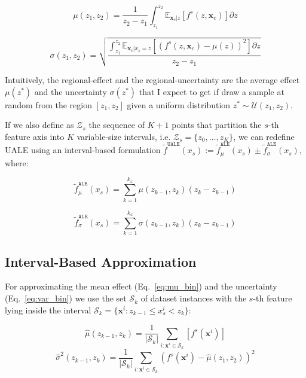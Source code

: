 \documentclass[twoside]{article}
\newcommand{\dfdx}{f^s}
\newcommand{\xc}{\mathbf{x}_c}
\begin{document}
\begin{equation}
  \label{eq:mu_bin}
  \mu(z_1, z_2) = \frac{1}{z_2 - z_1} \int_{z_1}^{z_2}
  \mathbb{E}_{\xc|z}\left [f^s(z, \xc) \right ] \partial z
\end{equation}

\noindent

\begin{equation}
  \label{eq:var_bin}
  \sigma(z_1, z_2) = \sqrt{\frac{\int_{z_1}^{z_2}
  \mathbb{E}_{\xc|x_s=z} \left [ (f^s(z, \xc) - \mu(z) )^2 \right] \partial z}{z_2 - z_1}}
\end{equation}

%
Intuitively, the regional-effect and the regional-uncertainty are the
average effect \(\mu(z^*)\) and the uncertainty \(\sigma(z^*)\) that I
expect to get if draw a sample at random from the region
\([z_1, z_2]\) given a uniform distribution
\(z^* \sim \mathcal{U}(z_1, z_2)\).

If we also define as \(\mathcal{Z}_s\) the sequence of \(K+1\) points
that partition the \(s\)-th feature axis into \(K\) variable-size
intervals, i.e. \(\mathcal{Z}_s = \{z_0, \ldots, z_K\}\), we can
redefine UALE using an interval-based formulation
\(\tilde{f}^{\mathtt{UALE}}(x_s):= \tilde{f}^{\mathtt{ALE}}_{\mu}(x_s)
\pm \tilde{f}^{\mathtt{ALE}}_{\sigma}(x_s)\), where:

\begin{equation}
  \label{eq:ALE_2}
  \tilde{f}^{\mathtt{ALE}}_{\mu}(x_s) = \sum_{k=1}^{k_x} \mu(z_{k-1}, z_k) (z_k - z_{k-1})
\end{equation}

\begin{equation}
  \label{eq:ALE_accumulated_var}
  \tilde{f}^{\mathtt{ALE}}_{\sigma}(x_s) =  \sum_{k=1}^{k_x} \sigma(z_{k-1}, z_k) (z_k - z_{k-1})
\end{equation}
%

\subsection{Interval-Based Approximation}
\label{sec:UALE-approximation}

For approximating the mean effect (Eq.~\eqref{eq:mu_bin}) and the
uncertainty (Eq.~\eqref{eq:var_bin}) we use the set \(\mathcal{S}_k\)
of dataset instances with the \(s\)-th feature lying inside the
interval
\( \mathcal{S}_k= \{ \mathbf{x}^i : z_{k-1} \leq x^i_s < z_k \} \):

\begin{equation}
  \label{eq:2}
  \hat{\mu}(z_{k-1}, z_k) = \frac{1}{|\mathcal{S}_k|}
  \sum_{i:\mathbf{x}^i \in \mathcal{S}_k} \left [ \dfdx(\mathbf{x}^i)
  \right ]
\end{equation}
%
\begin{equation}
  \label{eq:3}
  \hat{\sigma}^2(z_{k-1}, z_k) = \frac{1}{|\mathcal{S}_k|}
\sum_{i:\mathbf{x}^i \in \mathcal{S}_k} \left ( \dfdx(\mathbf{x}^i) -
  \hat{\mu}(z_1, z_2) \right )^2
\end{equation}
\end{document}
